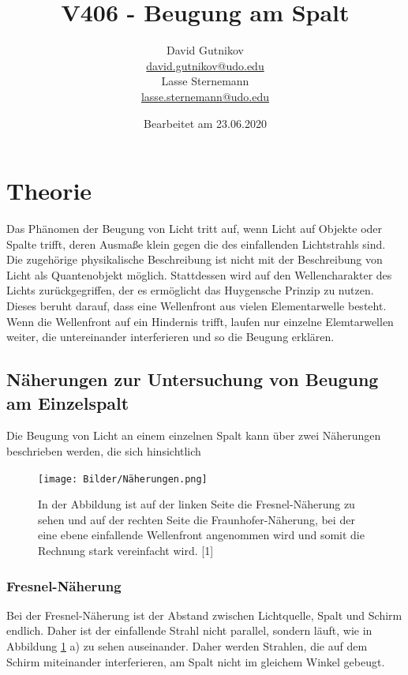 \documentclass[titlepage = firstcover]{scrartcl}
\title{V406 - Beugung am Spalt}
\author{
  David Gutnikov\\
  \href{mailto:david.gutnikov@udo.edu}{david.gutnikov@udo.edu}\\
  Lasse Sternemann\\
  \href{mailto:lasse.sternemann@udo.edu}{lasse.sternemann@udo.edu}
}
\date{Bearbeitet am 23.06.2020}
\begin{document}
    \maketitle
    \newpage
    \tableofcontents
    \newpage

    \section{Theorie}
        Das Phänomen der Beugung von Licht tritt auf, wenn Licht auf Objekte oder Spalte trifft, deren Ausmaße klein gegen die des einfallenden Lichtstrahls sind. Die zugehörige physikalische
        Beschreibung ist nicht mit der Beschreibung von Licht als Quantenobjekt möglich. Stattdessen wird auf den Wellencharakter des Lichts zurückgegriffen, der es ermöglicht das Huygensche
        Prinzip zu nutzen. Dieses beruht darauf, dass eine Wellenfront aus vielen Elementarwelle besteht. Wenn die Wellenfront auf ein Hindernis trifft, laufen nur einzelne Elemtarwellen weiter,
        die untereinander interferieren und so die Beugung erklären.

        \subsection{Näherungen zur Untersuchung von Beugung am Einzelspalt}
            Die Beugung von Licht an einem einzelnen Spalt kann über zwei Näherungen beschrieben werden, die sich hinsichtlich
            \FloatBarrier

            \begin{figure}[h]
              \centering
              \texttt{[image: Bilder/Näherungen.png]}
              \caption{In der Abbildung ist auf der linken Seite die Fresnel-Näherung zu sehen und auf der rechten Seite die Fraunhofer-Näherung, bei der eine ebene einfallende Wellenfront angenommen wird und somit die Rechnung stark vereinfacht wird. [1]}
              \label{fig:Näherungen}
            \end{figure}

            \FloatBarrier

            \noindent
            \subsubsection*{Fresnel-Näherung}
                Bei der Fresnel-Näherung ist der Abstand zwischen Lichtquelle, Spalt und Schirm endlich. Daher ist der einfallende Strahl nicht parallel, sondern läuft, wie in Abbildung 
                \ref{fig:Näherungen} a) zu sehen auseinander. Daher werden Strahlen, die auf dem Schirm miteinander interferieren, am Spalt nicht im gleichem Winkel gebeugt.
\end{document}

